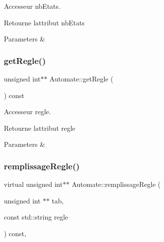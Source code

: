 Accesseur nb\+Etats. 

Retourne l\textquotesingle{}attribut nb\+Etats


\begin{DoxyParams}{Parameters}
{\em } & \\
\hline
\end{DoxyParams}
\mbox{\label{class_automate_a81f06f8d3508ca3fbb86740bb67cde18}} 
\subsubsection{\texorpdfstring{get\+Regle()}{getRegle()}}
{\footnotesize\ttfamily unsigned int$\ast$$\ast$ Automate\+::get\+Regle (\begin{DoxyParamCaption}{ }\end{DoxyParamCaption}) const\hspace{0.3cm}{\ttfamily [inline]}}



Accesseur regle. 

Retourne l\textquotesingle{}attribut regle


\begin{DoxyParams}{Parameters}
{\em } & \\
\hline
\end{DoxyParams}
\mbox{\label{class_automate_ada2ede5d67469b4634c73c081a54cd73}} 
\subsubsection{\texorpdfstring{remplissage\+Regle()}{remplissageRegle()}\hspace{0.1cm}{\footnotesize\ttfamily [1/2]}}
{\footnotesize\ttfamily virtual unsigned int$\ast$$\ast$ Automate\+::remplissage\+Regle (\begin{DoxyParamCaption}\item[{unsigned int $\ast$$\ast$}]{tab,  }\item[{const std\+::string}]{regle }\end{DoxyParamCaption}) const\hspace{0.3cm}{\ttfamily [protected]}, {}}



